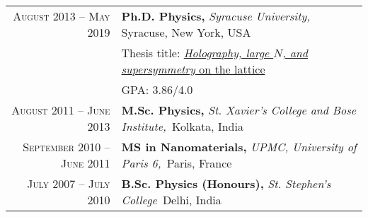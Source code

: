 \begin{tabular}{rl}	
	\textsc{August 2013 -- May 2019}  & \textbf{Ph.D. Physics,} \emph{Syracuse University,} Syracuse, New York, USA\\ 
									& Thesis title: \textcolor{blue}{\href{https://surface.syr.edu/etd/1003/}{\emph{Holography, large $N$, and \textit{supersymmetry}} on the lattice}} \\ 
									& \textsc{GPA:} 3.86/4.0\\
	\textsc{August 2011 -- June 2013} 	& \textbf{M.Sc. Physics,} \emph{St. Xavier's College and Bose Institute,}{~Kolkata, }{India} \\
	\textsc{September 2010 -- June 2011} 	& \textbf{MS in Nanomaterials,} \emph{UPMC, University of Paris 6,}{~Paris, }{France} \\
	\textsc{July 2007 -- July 2010} 	& \textbf{B.Sc. Physics (Honours),} \emph{St. Stephen's College}{~Delhi, }{India} \\	
\end{tabular}
